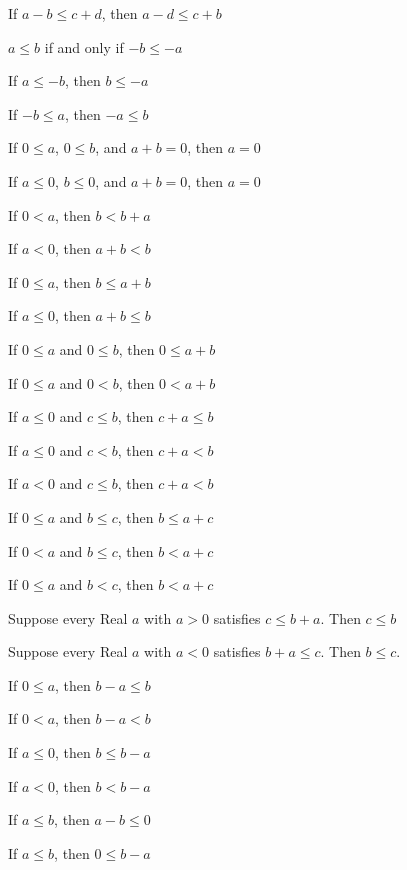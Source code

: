 \documentclass{article}
\let\xrbreak\medbreak
\begin{document}
\begin{thm}
\item\label{xreal1:23} If $a-b\leq c+d$, then $a-d\leq c+b$
  \xrbreak
\item\label{xreal1:24} $a\leq b$ if and only if $-b\leq-a$
\item\label{xreal1:25} If $a\leq-b$, then $b\leq-a$
\item\label{xreal1:26} If $-b\leq a$, then $-a\leq b$
  \xrbreak
\item\label{xreal1:27} If $0\leq a$, $0\leq b$, and $a+b=0$, then $a=0$
\item\label{xreal1:28} If $a\leq 0$, $b\leq 0$, and $a+b=0$, then $a=0$
  \xrbreak
\item\label{xreal1:29} If $0<a$, then $b<b+a$
\item\label{xreal1:30} If $a<0$, then $a+b<b$
\item\label{xreal1:31} If $0\leq a$, then $b\leq a+b$
\item\label{xreal1:32} If $a\leq 0$, then $a+b\leq b$
  \xrbreak
\item\label{xreal1:33} If $0\leq a$ and $0\leq b$, then $0\leq a+b$
\item\label{xreal1:34} If $0\leq a$ and $0<b$, then $0<a+b$
\item\label{xreal1:35} If $a\leq 0$ and $c\leq b$, then $c+a\leq b$
\item\label{xreal1:36} If $a\leq 0$ and $c<b$, then $c+a<b$
\item\label{xreal1:37} If $a<0$ and $c\leq b$, then $c+a<b$
\item\label{xreal1:38} If $0\leq a$ and $b\leq c$, then $b\leq a+c$
\item\label{xreal1:39} If $0<a$ and $b\leq c$, then $b<a+c$
\item\label{xreal1:40} If $0\leq a$ and $b<c$, then $b<a+c$
  \xrbreak
\item\label{xreal1:41} Suppose every Real $a$ with $a>0$ satisfies
  $c\leq b+a$. Then $c\leq b$
\item\label{xreal1:42} Suppose every Real $a$ with $a<0$ satisfies
  $b+a\leq c$. Then $b\leq c$.
  \xrbreak
\item\label{xreal1:43} If $0\leq a$, then $b-a\leq b$
\item\label{xreal1:44} If $0<a$, then $b-a<b$
\item\label{xreal1:45} If $a\leq 0$, then $b\leq b-a$
\item\label{xreal1:46} If $a<0$, then $b<b-a$
\item\label{xreal1:47} If $a\leq b$, then $a-b\leq0$
\item\label{xreal1:48} If $a\leq b$, then $0\leq b-a$

\end{thm}
\end{document}
